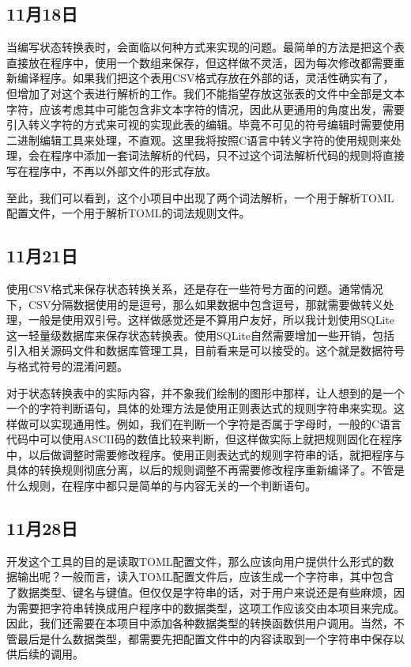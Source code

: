 \subsection{11月18日}
当编写状态转换表时，会面临以何种方式来实现的问题。最简单的方法是把这个表直接放在程序中，使用一个数组来保存，但这样做不灵活，因为每次修改都需要重新编译程序。如果我们把这个表用CSV格式存放在外部的话，灵活性确实有了，但增加了对这个表进行解析的工作。我们不能指望存放这张表的文件中全部是文本字符，应该考虑其中可能包含非文本字符的情况，因此从更通用的角度出发，需要引入转义字符的方式来可视的实现此表的编辑。毕竟不可见的符号编辑时需要使用二进制编辑工具来处理，不直观。这里我将按照C语言中转义字符的使用规则来处理，会在程序中添加一套词法解析的代码，只不过这个词法解析代码的规则将直接写在程序中，不再以外部文件的形式存放。

至此，我们可以看到，这个小项目中出现了两个词法解析，一个用于解析TOML配置文件，一个用于解析TOML的词法规则文件。


\subsection{11月21日}
使用CSV格式来保存状态转换关系，还是存在一些符号方面的问题。通常情况下，CSV分隔数据使用的是逗号，那么如果数据中包含逗号，那就需要做转义处理，一般是使用双引号。这样做感觉还是不算用户友好，所以我计划使用SQLite这一轻量级数据库来保存状态转换表。使用SQLite自然需要增加一些开销，包括引入相关源码文件和数据库管理工具，目前看来是可以接受的。这个就是数据符号与格式符号的混淆问题。

对于状态转换表中的实际内容，并不象我们绘制的图形中那样，让人想到的是一个一个的字符判断语句，具体的处理方法是使用正则表达式的规则字符串来实现。这样做可以实现通用性。例如，我们在判断一个字符是否属于字母时，一般的C语言代码中可以使用ASCII码的数值比较来判断，但这样做实际上就把规则固化在程序中，以后做调整时需要修改程序。使用正则表达式的规则字符串的话，就把程序与具体的转换规则彻底分离，以后的规则调整不再需要修改程序重新编译了。不管是什么规则，在程序中都只是简单的与内容无关的一个判断语句。


\subsection{11月28日}
开发这个工具的目的是读取TOML配置文件，那么应该向用户提供什么形式的数据输出呢？一般而言，读入TOML配置文件后，应该生成一个字符串，其中包含了数据类型、键名与键值。但仅仅是字符串的话，对于用户来说还是有些麻烦，因为需要把字符串转换成用户程序中的数据类型，这项工作应该交由本项目来完成。因此，我们还需要在本项目中添加各种数据类型的转换函数供用户调用。当然，不管最后是什么数据类型，都需要先把配置文件中的内容读取到一个字符串中保存以供后续的调用。

